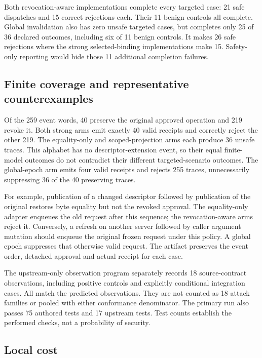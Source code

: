 Both revocation-aware implementations complete every targeted case: 21 safe dispatches and 15 correct rejections each. Their 11 benign controls all complete. Global invalidation also has zero unsafe targeted cases, but completes only 25 of 36 declared outcomes, including six of 11 benign controls. It makes 26 safe rejections where the strong selected-binding implementations make 15. Safety-only reporting would hide those 11 additional completion failures.

\subsection{Finite coverage and representative counterexamples}

Of the 259 event words, 40 preserve the original approved operation and 219 revoke it. Both strong arms emit exactly 40 valid receipts and correctly reject the other 219. The equality-only and scoped-projection arms each produce 36 unsafe traces. This alphabet has no descriptor-extension event, so their equal finite-model outcomes do not contradict their different targeted-scenario outcomes. The global-epoch arm emits four valid receipts and rejects 255 traces, unnecessarily suppressing 36 of the 40 preserving traces.

For example, publication of a changed descriptor followed by publication of the original restores byte equality but not the revoked approval. The equality-only adapter enqueues the old request after this sequence; the revocation-aware arms reject it. Conversely, a refresh on another server followed by caller argument mutation should enqueue the original frozen request under this policy. A global epoch suppresses that otherwise valid request. The artifact preserves the event order, detached approval and actual receipt for each case.

The upstream-only observation program separately records 18 source-contract observations, including positive controls and explicitly conditional integration cases. All match the predicted observations. They are not counted as 18 attack families or pooled with either conformance denominator. The primary run also passes 75 authored tests and 17 upstream tests. Test counts establish the performed checks, not a probability of security.

\subsection{Local cost}

